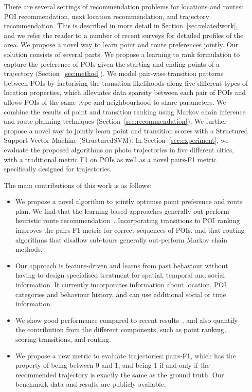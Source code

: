There are several settings of recommendation problems for locations and routes: POI recommendation,
next location recommendation, and trajectory recommendation. This is described in more detail in
Section~\ref{sec:relatedwork}, and we refer the reader to a number of recent
surveys\cite{bao2015recommendations,zheng2015trajectory,zheng2014urban}
for detailed profiles of the area.
We propose a novel way to learn point and route preferences jointly.
Our solution consists of several parts.
We propose a learning to rank formulation to capture the preference of POIs given the starting and ending points of a trajectory (Section~\ref{sec:method}).
We model pair-wise transition patterns between POIs by factorising the transition likelihoods along five different types of location properties,
which alleviates data sparsity between each pair of POIs and allows POIs of the same type and neighbourhood to share parameters.
We combine the results of point and transition ranking using Markov chain inference and route planning techniques (Section~\ref{sec:recommendation}). We further propose a novel way to jointly learn point and transition scores with a Structured Support Vector Machine (StructuredSVM). In Section~\ref{sec:experiment},
we evaluate the proposed algorithms on photo trajectories in five different cities, with a traditional metric F1 on POIs as well as a novel pairs-F1 metric specifically designed for trajectories.

The main contributions of this work is as follows:
\begin{itemize}
\setlength{\itemsep}{-2pt}
\item We propose a novel algorithm to jointly optimise point preference and route plan.
  We find that the learning-based approaches generally out-perform heuristic route recommendation~\cite{ijcai15}. Incorporating transitions to POI ranking improves the pairs-F1 metric for correct sequences of POIs, and that routing algorithms that disallow sub-tours generally out-perform Markov chain methods.
\item Our approach is feature-driven and learns from past behaviour without having to design specialised treatment for spatial, temporal and social information. It currently incorporates information about location, POI categories and behaviour history, and can use additional social or time information.%
\item We show good performance compared to recent results~\cite{ijcai15}, and also quantify the contribution from the different components, such as point ranking, scoring transitions, and routing.
\item We propose a new metric to evaluate trajectories: pairs-F1, which has the property of being between 0 and 1, and being 1 if and only if the recommended trajectory is exactly the same as the ground truth. Our benchmark data and results are publicly available.
\end{itemize}
